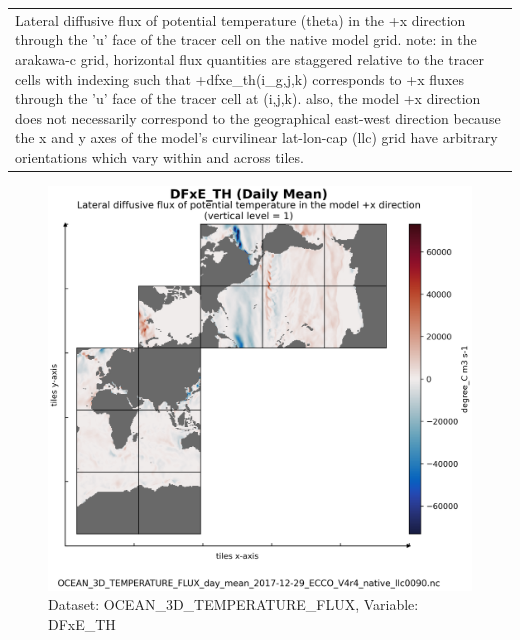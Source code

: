 \begin{longtable}{|m{}|m{}|m{}|m{}|}
\rowcolor{lightgray} \multicolumn{4}{|c|}{\textbf{Comments}} \\ \hline
\multicolumn{4}{|p{1\textwidth}|}{\footnotesize{{Lateral diffusive flux of potential temperature (theta) in the +x direction through the 'u' face of the tracer cell on the native model grid. note: in the arakawa-c grid, horizontal flux quantities are staggered relative to the tracer cells with indexing such that +dfxe\_th(i\_g,j,k) corresponds to +x fluxes through the 'u' face of the tracer cell at (i,j,k). also, the model +x direction does not necessarily correspond to the geographical east-west direction because the x and y axes of the model's curvilinear lat-lon-cap (llc) grid have arbitrary orientations which vary within and across tiles.}}} \\ \hline
\end{longtable}

\begin{figure}[H]
\centering
\includegraphics[scale=0.55]{../images/plots/v4r4/native_plots/Ocean_Three-Dimensional_Potential_Temperature_Fluxes/DFxE_TH.png}
\caption{Dataset: OCEAN\_3D\_TEMPERATURE\_FLUX, Variable: DFxE\_TH}
\label{tab:table-OCEAN_3D_TEMPERATURE_FLUX_DFxE_TH-Plot}
\end{figure}
\newpage
\pagebreak
